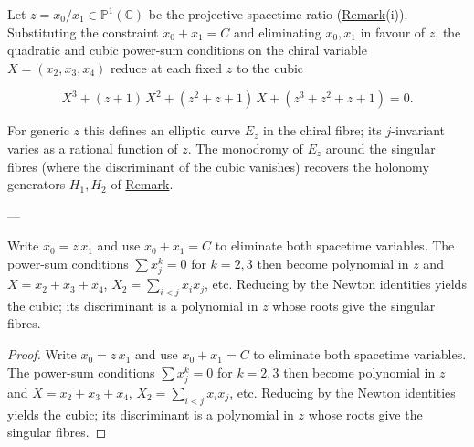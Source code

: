 \begin{proposition}
  \label{prop:chiral-elliptic}
Let $z=x_0/x_1\in\mathbb{P}^1(\mathbb{C})$ be the projective spacetime ratio
(\hyperref[rem:braid-group-action]{Remark}(i)).  Substituting the
constraint $x_0+x_1=C$ and eliminating $x_0,x_1$ in favour of $z$,
the quadratic and cubic power-sum
conditions on
the chiral variable $X=(x_2,x_3,x_4)$ reduce at each fixed $z$ to the
cubic

\begin{equation}\label{eq:chiral-elliptic}
  X^3+(z+1)\,X^2+(z^2+z+1)\,X+(z^3+z^2+z+1)=0.
\end{equation}

For generic $z$ this defines an elliptic curve $E_z$ in the chiral
fibre; its $j$-invariant varies as a rational function of $z$.  The
monodromy of $E_z$ around the singular fibres (where the discriminant
of the cubic vanishes) recovers the holonomy
generators $H_1,H_2$ of
\hyperref[rem:holonomy-trefoil]{Remark}.

---

Write $x_0=z\,x_1$ and use $x_0+x_1=C$ to eliminate both spacetime
variables.  The power-sum conditions $\sum x_j^k=0$ for $k=2,3$ then
become polynomial in $z$ and $X=x_2+x_3+x_4$, $X_2=\sum_{i<j}x_ix_j$,
etc.  Reducing by the Newton identities yields the
cubic; its discriminant is a polynomial
in $z$ whose roots give the singular fibres.
\end{proposition}
\begin{proof}
Write $x_0=z\,x_1$ and use $x_0+x_1=C$ to eliminate both spacetime
variables.  The power-sum conditions $\sum x_j^k=0$ for $k=2,3$ then
become polynomial in $z$ and $X=x_2+x_3+x_4$, $X_2=\sum_{i<j}x_ix_j$,
etc.  Reducing by the Newton identities yields the
cubic; its discriminant is a polynomial
in $z$ whose roots give the singular fibres.
\end{proof}


